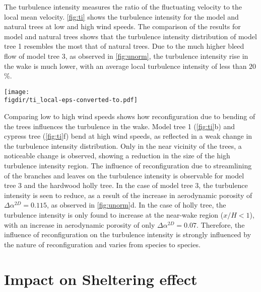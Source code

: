The turbulence intensity measures the ratio of the fluctuating velocity to the local mean velocity. \cref{fig:ti} shows the turbulence intensity for the model and natural trees at low and high wind speeds. The comparison of the results for model and natural trees shows that the turbulence intensity distribution of model tree 1 resembles the most that of natural trees. Due to the much higher bleed flow of model tree 3, as observed in \cref{fig:unorm}, the turbulence intensity rise in the wake is much lower, with an average local turbulence intensity of less than $20$\%.

	\begin{sidewaysfigure}[p]
	\centering
	\texttt{[image: \\figdir/ti\_local-eps-converted-to.pdf]}
	\caption{Turbulence intensity $I=\sqrt{2/3 k}/\tavg{\mvec{u}}$ (\%) of  model tree 1,  model tree 3,  cypress and  holly. The comparison is done for two wind speeds:  $U_{\textit{ref}}=1$ m\,s$^{-1}$ and  $U_{\textit{ref}}=10$ m\,s$^{-1}$.}
	\label{fig:ti}
	\end{sidewaysfigure}

Comparing low to high wind speeds shows how reconfiguration due to bending of the trees influences the turbulence in the wake. Model tree 1 (\cref{fig:ti}b) and cypress tree (\cref{fig:ti}f) bend at high wind speeds, as reflected in a weak change in the turbulence intensity distribution. Only in the near vicinity of the trees, a noticeable change is observed, showing a reduction in the size of the high turbulence intensity region. The influence of reconfiguration due to streamlining of the branches and leaves on the turbulence intensity is observable for model tree 3 and the hardwood holly tree. In the case of model tree 3, the turbulence intensity is seen to reduce, as a result of the increase in aerodynamic porosity of $\Delta \alpha^{\textit{2D}} = 0.115$, as observed in \cref{fig:unorm}d. In the case of holly tree, the turbulence intensity is only found to increase at the near-wake region ($x/H<1$), with an increase in aerodynamic porosity of only $\Delta \alpha^{\textit{2D}} = 0.07$. Therefore, the influence of reconfiguration on the turbulence intensity is strongly influenced by the nature of reconfiguration and varies from species to species.


\section{Impact on Sheltering effect}

